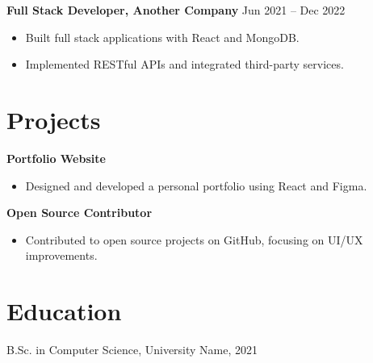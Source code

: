 \documentclass[a4paper,10pt]{article}
\begin{document}
\textbf{Full Stack Developer, Another Company} \hfill Jun 2021 -- Dec 2022\\
\begin{itemize}[leftmargin=*]
    \item Built full stack applications with React and MongoDB.
    \item Implemented RESTful APIs and integrated third-party services.
\end{itemize}

\section*{Projects}
\textbf{Portfolio Website}
\begin{itemize}[leftmargin=*]
    \item Designed and developed a personal portfolio using React and Figma.
\end{itemize}
\textbf{Open Source Contributor}
\begin{itemize}[leftmargin=*]
    \item Contributed to open source projects on GitHub, focusing on UI/UX improvements.
\end{itemize}

\section*{Education}
B.Sc. in Computer Science, University Name, 2021
\end{document}
